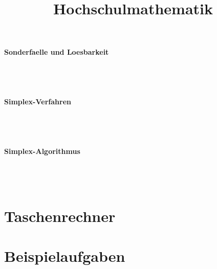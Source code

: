 \documentclass[a4paper]{article} %
\begin{document}
	\paragraph{Sonderfaelle und Loesbarkeit}
	 \hspace{0 cm} \\ \noindent \\
	\paragraph{Simplex-Verfahren}
	 \hspace{0 cm} \\ \noindent \\
	\paragraph{Simplex-Algorithmus}
	 \hspace{0 cm} \\ \noindent \\
	\section{Taschenrechner}
	\section{Beispielaufgaben}


	\title{Hochschulmathematik}
	\date{} %
	\maketitle
	\newpage
	
	
	
	
\end{document}
